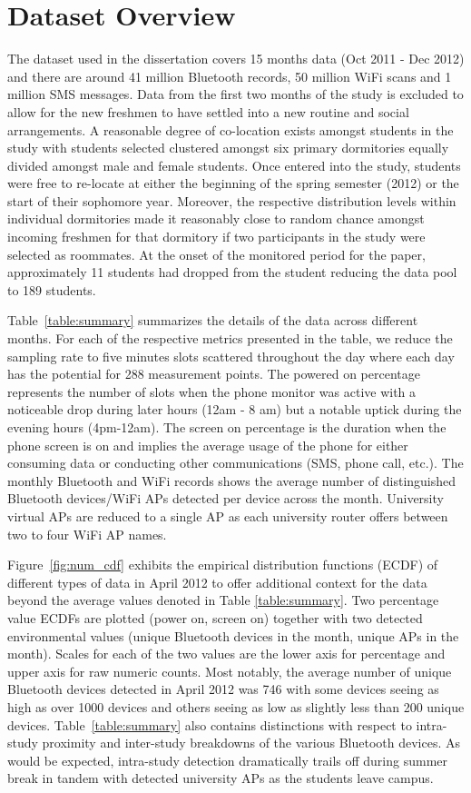 \section{Dataset Overview}
The dataset used in the dissertation covers 15 months data (Oct 2011 - Dec 2012) and there are around 41 million Bluetooth records, 50 million WiFi scans and 1 million SMS messages. Data from the first two months of the study is excluded to allow for the new freshmen to have settled into a new routine and social arrangements.  A reasonable degree of co-location exists amongst students in the study with students selected clustered amongst six primary dormitories equally divided amongst male and female students.  Once entered into the study, students were free to re-locate at either the beginning of the spring semester (2012) or the start of their sophomore year.  Moreover, the respective distribution levels within individual dormitories made it reasonably close to random chance amongst incoming freshmen for that dormitory if two participants in the study were selected as roommates. At the onset of the monitored period for the paper, approximately 11 students had dropped from the student reducing the data pool to 189 students.  

Table~\ref{table:summary} summarizes the details of the data across different months.  For each of the respective metrics presented in the table, we reduce the sampling rate to five minutes slots scattered throughout the day where each day has the potential for 288 measurement points.  The powered on percentage represents the number of slots when the phone monitor was active with a noticeable drop during later hours (12am - 8 am) but a notable uptick during the evening hours (4pm-12am).  The screen on percentage is the duration when the phone screen is on and implies the average usage of the phone for either consuming data or conducting other communications (SMS, phone call, etc.).  The monthly Bluetooth and WiFi records shows the average number of distinguished Bluetooth devices/WiFi APs detected per device across the month.  University virtual APs are reduced to a single AP as each university router offers between two to four WiFi AP names.  

Figure~\ref{fig:num_cdf} exhibits the empirical distribution functions (ECDF) of different types of data in April 2012 to offer additional context for the data beyond the average values denoted in Table \ref{table:summary}.  Two percentage value ECDFs are plotted (power on, screen on) together with two detected environmental values (unique Bluetooth devices in the month, unique APs in the month).  Scales for each of the two values are the lower axis for percentage and upper axis for raw numeric counts.   Most notably, the average number of unique Bluetooth devices detected in April 2012 was 746 with some devices seeing as high as over 1000 devices and others seeing as low as slightly less than 200 unique devices.  Table~\ref{table:summary} also contains distinctions with respect to intra-study proximity and inter-study breakdowns of the various Bluetooth devices.  As would be expected, intra-study detection dramatically trails off during summer break in tandem with detected university APs as the students leave campus.       

